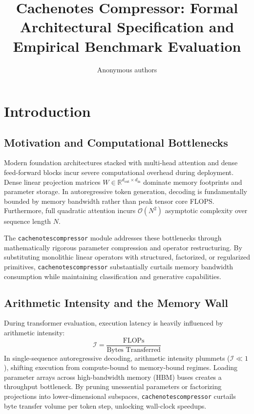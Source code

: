\title{\textbf{Cachenotes Compressor: Formal Architectural Specification and Empirical Benchmark Evaluation}}

\author{Anonymous authors}


\section{Introduction}

\subsection{Motivation and Computational Bottlenecks}
Modern foundation architectures stacked with multi-head attention and dense feed-forward blocks incur severe computational overhead during deployment. Dense linear projection matrices $W \in \mathbb{R}^{d_{\text{out}} \times d_{\text{in}}}$ dominate memory footprints and parameter storage. In autoregressive token generation, decoding is fundamentally bounded by memory bandwidth rather than peak tensor core FLOPS. Furthermore, full quadratic attention incurs $\mathcal{O}(N^2)$ asymptotic complexity over sequence length $N$.

The \texttt{cachenotescompressor} module addresses these bottlenecks through mathematically rigorous parameter compression and operator restructuring. By substituting monolithic linear operators with structured, factorized, or regularized primitives, \texttt{cachenotescompressor} substantially curtails memory bandwidth consumption while maintaining classification and generative capabilities.

\subsection{Arithmetic Intensity and the Memory Wall}
During transformer evaluation, execution latency is heavily influenced by arithmetic intensity:
\[
\mathcal{I} = \frac{\text{FLOPs}}{\text{Bytes Transferred}}
\]
In single-sequence autoregressive decoding, arithmetic intensity plummets ($\mathcal{I} \ll 1$), shifting execution from compute-bound to memory-bound regimes. Loading parameter arrays across high-bandwidth memory (HBM) buses creates a throughput bottleneck. By pruning unessential parameters or factorizing projections into lower-dimensional subspaces, \texttt{cachenotescompressor} curtails byte transfer volume per token step, unlocking wall-clock speedups.


